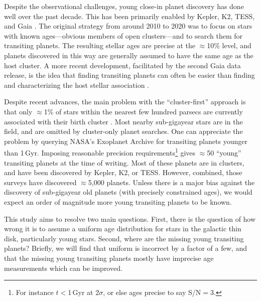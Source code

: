 \documentclass[11pt,twocolumn,tighten]{aastex63}
\begin{document}
Despite the observational challenges, young close-in planet discovery
has done well over the past decade.  This has been primarily enabled
by Kepler, K2, TESS, and Gaia
\citep[e.g.][]{Meibom_2013,Mann_K2_25_2016,Mann_2017,Curtis_2018,Livingston_2018,David_2019,Bouma_2020_toi837,Rizzuto_2020,Plavchan_2020,Newton_2021,Nardiello_2022,Tofflemire_2021,Barber_2022,Bouma_2022a,Bouma_2022b,Zhou_2022,Zakhozhay_2022,Wood_2023}.
The original strategy from around 2010 to 2020 was to focus on stars
with known ages---obvious members of open clusters---and to search
them for transiting planets.  The resulting stellar ages are precise
at the $\approx$10\% level, and planets discovered in this way are
generally assumed to have the same age as the host cluster.  A more
recent development, facilitated by the second Gaia data release, is
the idea that finding transiting planets can often be easier than
finding and characterizing the host stellar association
\citep[e.g.][]{Tofflemire_2021}.

Despite recent advances, the main problem with the ``cluster-first''
approach is that only $\approx$1\% of stars within the nearest few
hundred parsecs are currently associated with their birth cluster
\citep[e.g.][]{Zari_2018,CantatGaudin_2020,Kounkel_2020,Kerr_2021}.
Most nearby sub-gigayear stars are in the field, and are omitted by
cluster-only planet searches.  
One can appreciate the problem by querying NASA's Exoplanet Archive
\citep[NEA;][]{2013PASP..125..989A}
for transiting planets younger than 1\,Gyr.  Imposing reasonable
precision requirements\footnote{For instance $t$$<$1\,Gyr at 2$\sigma$, or else
ages precise to say S/N$=$3.} gives $\approx$50 ``young''
transiting planets at the time of writing.  Most of these planets are
in clusters, and have been discovered by Kepler, K2, or TESS.
However, combined, those surveys have discovered $\approx$5{,}000
planets.  Unless there is a major bias against the discovery of
sub-gigayear old planets (with precisely constrained ages), we would
expect an order of magnitude more young transiting planets to be
known.

This study aims to resolve two main questions.  First, there is the
question of how wrong it is to assume a uniform age distribution for
stars in the galactic thin disk, particularly young stars.  Second,
where are the missing young transiting planets?  Briefly, we will find
that uniform is incorrect by a factor of a few, and that the missing
young transiting planets mostly have imprecise age measurements which
can be improved.
\end{document}
